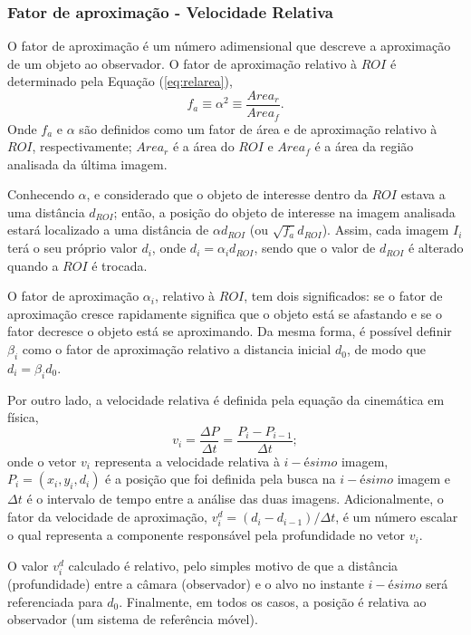 \subsubsection{Fator de aproximação - Velocidade Relativa}

O fator de aproximação é um número adimensional que descreve a
aproximação de um objeto ao observador.
O fator de aproximação relativo à $ROI$ é determinado pela Equação (\ref{eq:relarea}),
\begin{equation}\label{eq:relarea}
f_a \equiv \alpha^2 \equiv \frac{Area_r}{Area_f}.
\end{equation}
Onde $f_a$ e $\alpha$ são definidos como um fator de área e de aproximação relativo à $ROI$,
respectivamente; $Area_r$ é a área do $ROI$ e $Area_f$ é a área da região analisada
da última imagem.

Conhecendo $\alpha$, e considerado que o objeto de interesse dentro da $ROI$ estava a uma distância $d_{ROI}$; então,
a posição do objeto de interesse na imagem analisada 
estará localizado a uma distância de $\alpha d_{ROI}$ (ou $\sqrt{f_a} d_{ROI}$). Assim, cada  imagem $I_i$
terá o seu próprio  valor $d_i$, onde $d_i=\alpha_i d_{ROI}$, sendo que o valor de $d_{ROI}$
é alterado quando a $ROI$ é trocada.

O fator de aproximação $\alpha_i$, relativo à $ROI$, tem 
dois significados: se o fator de aproximação cresce rapidamente 
significa que o objeto está se afastando e se o fator decresce o objeto está se aproximando.
Da mesma forma, é possível definir $\beta_i$ como o fator de aproximação relativo
a distancia inicial $d_0$, de modo que $d_i=\beta_i d_0$.

Por outro lado, a velocidade relativa é definida pela equação da cinemática em física,
\begin{equation}
 v_i = \frac{\Delta P}{\Delta t}= \frac{P_i-P_{i-1}}{\Delta t};
\end{equation}
onde o vetor $v_i$ representa a velocidade relativa à $i-ésimo$ imagem, $P_i=(x_i,y_i,d_i)$ é a posição que
foi definida pela busca na $i-ésimo$ imagem e $\Delta t$ é o intervalo de tempo entre a análise das duas imagens.
Adicionalmente, o fator da velocidade de aproximação, $v^d_i=(d_i-d_{i-1})/{\Delta t}$, 
é um número escalar o qual representa a componente
responsável pela profundidade no vetor $v_i$.

O valor $v^d_i$ calculado é relativo, pelo simples motivo de que a distância (profundidade) entre a câmara 
(observador) e o alvo no instante $i-ésimo$ será referenciada para $d_0$. 
Finalmente, em todos os casos, a posição é 
relativa ao observador (um sistema de referência móvel).

